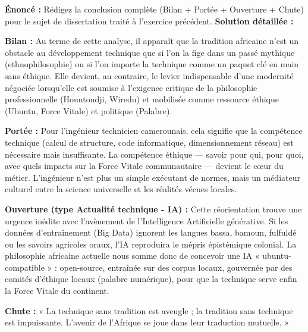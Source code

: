 \documentclass[11pt]{article}
\newcommand{\cle}[1]{{\popxbold\color{popdark}#1}}
\begin{document}
\begin{exoresolu}
\textbf{Énoncé :} Rédigez la conclusion complète (Bilan + Portée + Ouverture + Chute) pour le sujet de dissertation traité à l'exercice précédent.
\tcblower
\textbf{Solution détaillée :}

\textbf{Bilan :} Au terme de cette analyse, il apparaît que la tradition africaine n'est un obstacle au développement technique que si l'on la fige dans un passé mythique (ethnophilosophie) ou si l'on importe la technique comme un paquet clé en main sans éthique. Elle devient, au contraire, le \cle{levier indispensable} d'une modernité négociée lorsqu'elle est soumise à l'exigence critique de la philosophie professionnelle (Hountondji, Wiredu) et mobilisée comme ressource éthique (Ubuntu, Force Vitale) et politique (Palabre).

\textbf{Portée :} Pour l'ingénieur technicien camerounais, cela signifie que la \cle{compétence technique} (calcul de structure, code informatique, dimensionnement réseau) est \cle{nécessaire mais insuffisante}. La \cle{compétence éthique} — savoir pour qui, pour quoi, avec quels impacts sur la Force Vitale communautaire — devient le cœur du métier. L'ingénieur n'est plus un simple exécutant de normes, mais un \cle{médiateur culturel} entre la science universelle et les réalités vécues locales.

\textbf{Ouverture (type Actualité technique - IA) :} Cette réorientation trouve une urgence inédite avec l'avènement de l'\cle{Intelligence Artificielle générative}. Si les données d'entraînement (Big Data) ignorent les langues bassa, bamoun, fulfuldé ou les savoirs agricoles oraux, l'IA reproduira le mépris épistémique colonial. La philosophie africaine actuelle nous somme donc de concevoir une \cle{IA « ubuntu-compatible »} : open-source, entraînée sur des corpus locaux, gouvernée par des comités d'éthique locaux (palabre numérique), pour que la technique serve enfin la \cle{Force Vitale} du continent.

\textbf{Chute :} « La technique sans tradition est aveugle ; la tradition sans technique est impuissante. L'avenir de l'Afrique se joue dans leur \cle{traduction mutuelle}. »
\end{exoresolu}
\end{document}
